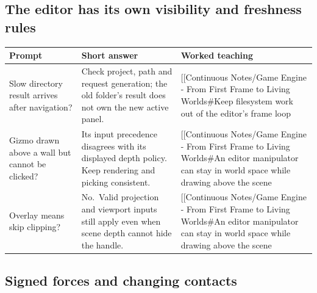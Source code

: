\subsection{The editor has its own visibility and freshness rules}\label{appendix-64ea716dcadc-the-editor-has-its-own-visibility-and-freshness-rules}

{\def\LTcaptype{none} %
\begin{longtable}[]{@{}
  >{\raggedright\arraybackslash}p{}
  >{\raggedright\arraybackslash}p{}
  >{\raggedright\arraybackslash}p{}@{}}
\toprule\noalign{}
\begin{minipage}[b]{\linewidth}\raggedright
Prompt
\end{minipage} & \begin{minipage}[b]{\linewidth}\raggedright
Short answer
\end{minipage} & \begin{minipage}[b]{\linewidth}\raggedright
Worked teaching
\end{minipage} \\
\midrule\noalign{}
\endhead
\bottomrule\noalign{}
\endlastfoot
Slow directory result arrives after navigation? & Check project, path and request generation; the old folder's result does not own the new active panel. & {[}{[}Continuous Notes/Game Engine - From First Frame to Living Worlds\#Keep filesystem work out of the editor's frame loop \\
Gizmo drawn above a wall but cannot be clicked? & Its input precedence disagrees with its displayed depth policy. Keep rendering and picking consistent. & {[}{[}Continuous Notes/Game Engine - From First Frame to Living Worlds\#An editor manipulator can stay in world space while drawing above the scene \\
Overlay means skip clipping? & No.~Valid projection and viewport inputs still apply even when scene depth cannot hide the handle. & {[}{[}Continuous Notes/Game Engine - From First Frame to Living Worlds\#An editor manipulator can stay in world space while drawing above the scene \\
\end{longtable}
}

\subsection{Signed forces and changing contacts}\label{appendix-64ea716dcadc-signed-forces-and-changing-contacts}

